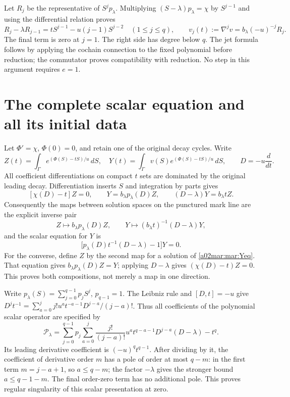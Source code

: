 Let $R_j$ be the representative of $S^jp_\lambda$. Multiplying
$(S-\lambda)p_\lambda=\chi$ by $S^{j-1}$ and using the differential
relation proves
\begin{equation}\tag{MAR3}\label{a02mar:mar:rec}
 R_j-\lambda R_{j-1}=tS^{j-1}-u(j-1)S^{j-2}\quad(1\le j\le q),
 \qquad v_j(t):=\nabla^jv=b_\lambda(-u)^{-j}R_j.
\end{equation}
The final term is zero at $j=1$. The right side has degree below $q$.
The jet formula follows by applying the cochain connection to the fixed
polynomial before reduction; the commutator proves compatibility with
reduction. No step in this argument requires $e=1$.

\section{The complete scalar equation and all its initial data}
Let $\Phi'=\chi$, $\Phi(0)=0$, and retain one of the original decay
cycles. Write
\[
 Z(t)=\int_\Gamma e^{(\Phi(S)-tS)/u}\,dS,\quad
 Y(t)=\int_\Gamma v(S)e^{(\Phi(S)-tS)/u}\,dS,
 \qquad D=-u\frac{d}{dt}.
\]
All coefficient differentiations on compact $t$ sets are dominated by
the original leading decay. Differentiation inserts $S$ and integration
by parts gives
\begin{equation}\tag{MAR4}\label{a02mar:mar:scalar-maps}
 [\chi(D)-t]Z=0,\qquad
 Y=b_\lambda p_\lambda(D)Z,\qquad
 (D-\lambda)Y=b_\lambda t Z.
\end{equation}
Consequently the maps between solution spaces on the punctured mark line
are the explicit inverse pair
\begin{equation}\tag{MAR5}\label{a02mar:mar:inverse-solutions}
 Z\longmapsto b_\lambda p_\lambda(D)Z,
 \qquad Y\longmapsto (b_\lambda t)^{-1}(D-\lambda)Y,
\end{equation}
and the scalar equation for $Y$ is
\begin{equation}\tag{MAR6}\label{a02mar:mar:Yeq}
 \bigl[p_\lambda(D)t^{-1}(D-\lambda)-1\bigr]Y=0.
\end{equation}
For the converse, define $Z$ by the second map for a solution of
\eqref{a02mar:mar:Yeq}. That equation gives $b_\lambda p_\lambda(D)Z=Y$;
applying $D-\lambda$ gives $(\chi(D)-t)Z=0$. This proves both
compositions, not merely a map in one direction.

Write $p_\lambda(S)=\sum_{j=0}^{q-1}p_jS^j$, $p_{q-1}=1$.
The Leibniz rule and $[D,t]=-u$ give
$D^jt^{-1}=\sum_{a=0}^j j!u^a t^{-a-1}D^{j-a}/(j-a)!$.
Thus all coefficients of the polynomial scalar operator are specified by
\begin{equation}\tag{MAR7}\label{a02mar:mar:P}
 \mathscr P_\lambda=
 \sum_{j=0}^{q-1}p_j\sum_{a=0}^j
 \frac{j!}{(j-a)!}u^a t^{q-a-1}D^{j-a}(D-\lambda)-t^q.
\end{equation}
Its leading derivative coefficient is $(-u)^q t^{q-1}$.
After dividing by it, the coefficient of derivative order $m$ has
a pole of order at most $q-m$: in the first term $m=j-a+1$,
so $a\le q-m$; the factor $-\lambda$ gives the stronger bound
$a\le q-1-m$. The final order-zero term has no additional pole.
This proves regular singularity of this scalar presentation at zero.

